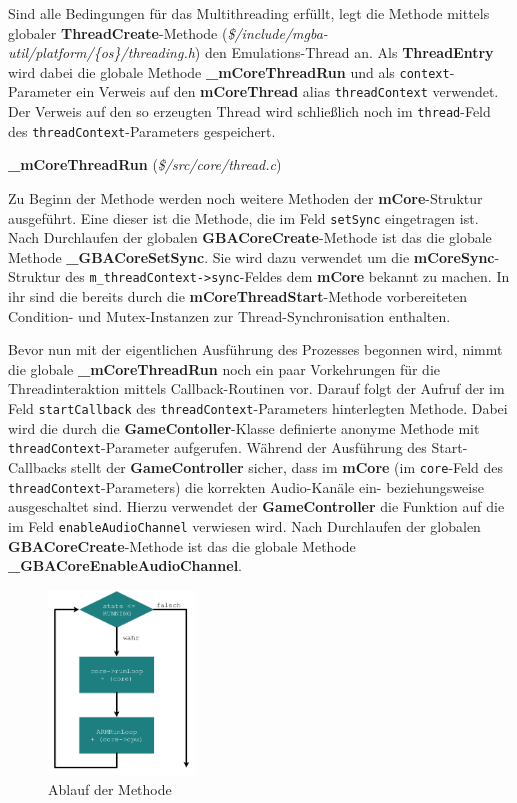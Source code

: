 \documentclass[11pt,a4paper]{scrartcl}
\newcommand{\paratitlecode}[2] {
    \vspace{5mm}
    \large \textbf{#1} \normalsize(\textit{\${#2}})
    \vspace{2mm}\newline
}
\begin{document}
Sind alle Bedingungen f\"ur das Multithreading erf\"ullt, legt die Methode mittels globaler \textbf{ThreadCreate}-Methode (\textit{\$/include/mgba-util/platform/\{os\}/threading.h}) den Emulations-Thread an. Als \textbf{ThreadEntry} wird dabei die globale Methode \textbf{{\_}mCoreThreadRun} und als \verb|context|-Parameter ein Verweis auf den \textbf{mCoreThread} alias \verb|threadContext| verwendet. Der Verweis auf den so erzeugten Thread wird schlie{\ss}lich noch im \verb|thread|-Feld des \verb|threadContext|-Parameters gespeichert.

\paratitlecode{{\_}mCoreThreadRun}{/src/core/thread.c}
Zu Beginn der Methode werden noch weitere Methoden der \textbf{mCore}-Struktur ausgef\"uhrt. Eine dieser ist die Methode, die im Feld \verb|setSync| eingetragen ist. Nach Durchlaufen der globalen \textbf{GBACoreCreate}-Methode ist das die globale Methode \textbf{{\_}GBACoreSetSync}. Sie wird dazu verwendet um die \textbf{mCoreSync}-Struktur des \verb|m_threadContext->sync|-Feldes dem \textbf{mCore} bekannt zu machen. In ihr sind die bereits durch die \textbf{mCoreThreadStart}-Methode vorbereiteten Condition- und Mutex-Instanzen zur Thread-Synchronisation enthalten.

Bevor nun mit der eigentlichen Ausf\"uhrung des Prozesses begonnen wird, nimmt die globale \textbf{{\_}mCoreThreadRun} noch ein paar Vorkehrungen f\"ur die Threadinteraktion mittels Callback-Routinen vor. Darauf folgt der Aufruf der im Feld \verb|startCallback| des \verb|threadContext|-Parameters hinterlegten Methode. Dabei wird die durch die \textbf{GameContoller}-Klasse definierte anonyme Methode mit \verb|threadContext|-Parameter aufgerufen. W\"ahrend der Ausf\"uhrung des Start-Callbacks stellt der \textbf{GameController} sicher, dass im \textbf{mCore} (im \verb|core|-Feld des \verb|threadContext|-Parameters) die korrekten Audio-Kan\"ale ein- beziehungsweise ausgeschaltet sind. Hierzu verwendet der \textbf{GameController} die Funktion auf die im Feld \verb|enableAudioChannel| verwiesen wird. Nach Durchlaufen der globalen \textbf{GBACoreCreate}-Methode ist das die globale Methode \textbf{{\_}GBACoreEnableAudioChannel}.

\begin{figure}
    \centering
    \vspace{-7mm}
    \includegraphics[width=0.35\textwidth]{Emulator_RunLoop}
    \caption{Ablauf der Methode}
    \label{fig:runloop}
\end{figure}
\end{document}
